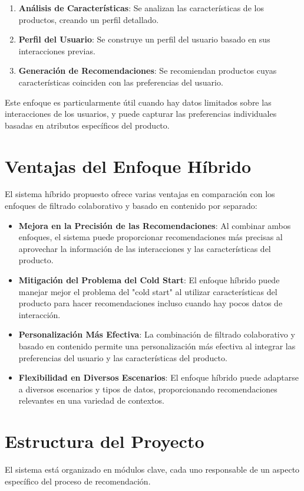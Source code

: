 \documentclass{llncs}
\begin{document}
\begin{enumerate}
    \item \textbf{Análisis de Características}: Se analizan las características de los productos, creando un perfil detallado.
    \item \textbf{Perfil del Usuario}: Se construye un perfil del usuario basado en sus interacciones previas.
    \item \textbf{Generación de Recomendaciones}: Se recomiendan productos cuyas características coinciden con las preferencias del usuario.
\end{enumerate}

Este enfoque es particularmente útil cuando hay datos limitados sobre las interacciones de los usuarios, y puede capturar las preferencias individuales basadas en atributos específicos del producto.

\section{Ventajas del Enfoque Híbrido}
El sistema híbrido propuesto ofrece varias ventajas en comparación con los enfoques de filtrado colaborativo y basado en contenido por separado:

\begin{itemize}
    \item \textbf{Mejora en la Precisión de las Recomendaciones}: Al combinar ambos enfoques, el sistema puede proporcionar recomendaciones más precisas al aprovechar la información de las interacciones y las características del producto.
    \item \textbf{Mitigación del Problema del Cold Start}: El enfoque híbrido puede manejar mejor el problema del "cold start" al utilizar características del producto para hacer recomendaciones incluso cuando hay pocos datos de interacción.
    \item \textbf{Personalización Más Efectiva}: La combinación de filtrado colaborativo y basado en contenido permite una personalización más efectiva al integrar las preferencias del usuario y las características del producto.
    \item \textbf{Flexibilidad en Diversos Escenarios}: El enfoque híbrido puede adaptarse a diversos escenarios y tipos de datos, proporcionando recomendaciones relevantes en una variedad de contextos.
\end{itemize}

\section{Estructura del Proyecto}
El sistema está organizado en módulos clave, cada uno responsable de un aspecto específico del proceso de recomendación.
\end{document}
